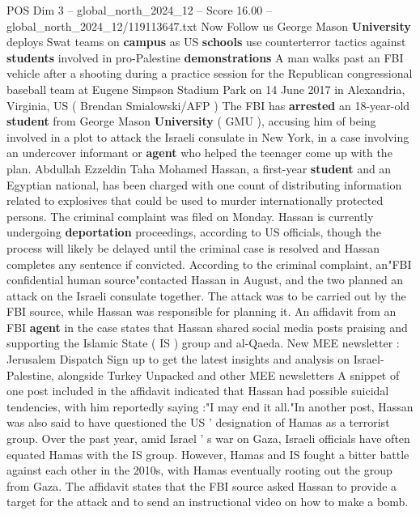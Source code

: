 \begin{textsample}{POS Dim 3 – global\_north\_2024\_12 – Score 16.00 – global\_north\_2024\_12/119113647.txt}  \label{ex:f3_pos_235}
Now Follow us George Mason \textbf{University} deploys Swat teams on \textbf{campus} as US \textbf{schools} use counterterror tactics against \textbf{students} involved in pro-Palestine \textbf{demonstrations} A man walks past an FBI vehicle after a shooting during a practice session for the Republican congressional baseball team at Eugene Simpson Stadium Park on 14 June 2017 in Alexandria, Virginia, US ( Brendan Smialowski/AFP ) The FBI has \textbf{arrested} an 18-year-old \textbf{student} from George Mason \textbf{University} ( GMU ), accusing him of being involved in a plot to attack the Israeli consulate in New York, in a case involving an undercover informant or \textbf{agent} who helped the teenager come up with the plan.
Abdullah Ezzeldin Taha Mohamed Hassan, a first-year \textbf{student} and an Egyptian national, has been charged with one count of distributing information related to explosives that could be used to murder internationally protected persons.
The criminal complaint was filed on Monday.
Hassan is currently undergoing \textbf{deportation} proceedings, according to US officials, though the process will likely be delayed until the criminal case is resolved and Hassan completes any sentence if convicted.
According to the criminal complaint, an"FBI confidential human source"contacted Hassan in August, and the two planned an attack on the Israeli consulate together.
The attack was to be carried out by the FBI source, while Hassan was responsible for planning it.
An affidavit from an FBI \textbf{agent} in the case states that Hassan shared social media posts praising and supporting the Islamic State ( IS ) group and al-Qaeda.
New MEE newsletter : Jerusalem Dispatch Sign up to get the latest insights and analysis on Israel-Palestine, alongside Turkey Unpacked and other MEE newsletters A snippet of one post included in the affidavit indicated that Hassan had possible suicidal tendencies, with him reportedly saying :"I may end it all."In another post, Hassan was also said to have questioned the US ' designation of Hamas as a terrorist group.
Over the past year, amid Israel ' s war on Gaza, Israeli officials have often equated Hamas with the IS group.
However, Hamas and IS fought a bitter battle against each other in the 2010s, with Hamas eventually rooting out the group from Gaza.
The affidavit states that the FBI source asked Hassan to provide a target for the attack and to send an instructional video on how to make a bomb.

\end{textsample}
